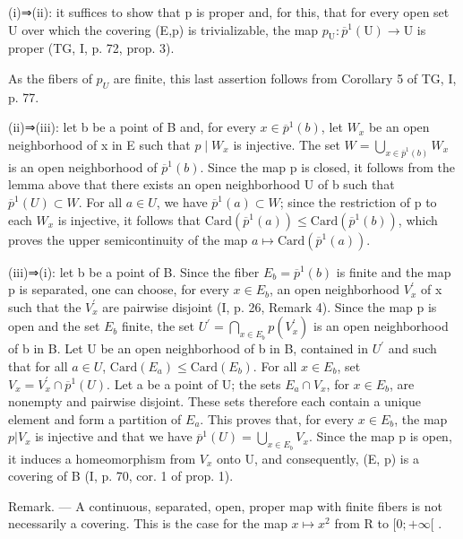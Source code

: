 (i)⇒(ii): it suffices to show that p is proper and, for this, that for every open set U over which the covering (E,p) is trivializable, the map \(p_{\mathrm{U}}\colon \overline{p}^{1}(\mathrm{U})\to\mathrm{U}\) is proper (TG, I, p. 72, prop. 3).

As the fibers of \(p_{U}\) are finite, this last assertion follows from Corollary 5 of TG, I, p. 77.

(ii)⇒(iii): let b be a point of B and, for every \(x \in \overline{p}^{1}(b)\), let \(W_{x}\) be an open neighborhood of x in E such that \(p \mid W_{x}\) is injective. The set \(W = \bigcup_{x \in \overline{p}^{1}(b)} W_{x}\) is an open neighborhood of \(\overline{p}^{1}(b)\). Since the map p is closed, it follows from the lemma above that there exists an open neighborhood U of b such that \(\overline{p}^{1}(U) \subset W\). For all \(a \in U\), we have \(\overline{p}^{1}(a) \subset W\); since the restriction of p to each \(W_{x}\) is injective, it follows that \(\text{Card}(\overline{p}^{1}(a)) \leqslant \text{Card}(\overline{p}^{1}(b))\), which proves the upper semicontinuity of the map \(a \mapsto \text{Card}(\overline{p}^{1}(a))\).

(iii)⇒(i): let b be a point of B. Since the fiber \(E_{b} = \overline{p}^{1}(b)\) is finite and the map p is separated, one can choose, for every \(x \in E_{b}\), an open neighborhood \(V_{x}^{\prime}\) of x such that the \(V_{x}^{\prime}\) are pairwise disjoint (I, p. 26, Remark 4). Since the map p is open and the set \(E_{b}\) finite, the set \(U^{\prime} = \bigcap_{x \in E_{b}} p(V_{x}^{\prime})\) is an open neighborhood of b in B. Let U be an open neighborhood of b in B, contained in \(U^{\prime}\) and such that for all \(a \in U\), \(\text{Card}(E_{a}) \leqslant \text{Card}(E_{b})\). For all \(x \in E_{b}\), set \(V_{x} = V_{x}^{\prime} \cap \overline{p}^{1}(U)\). Let a be a point of U; the sets \(E_{a} \cap V_{x}\), for \(x \in E_{b}\), are nonempty and pairwise disjoint. These sets therefore each contain a unique element and form a partition of \(E_{a}\). This proves that, for every \(x \in E_{b}\), the map \(p | V_{x}\) is injective and that we have \(\overline{p}^{1}(U) = \bigcup_{x \in E_{b}} V_{x}\). Since the map p is open, it induces a homeomorphism from \(V_{x}\) onto U, and consequently, (E, p) is a covering of B (I, p. 70, cor. 1 of prop. 1).

Remark. --- A continuous, separated, open, proper map with finite fibers is not necessarily a covering. This is the case for the map \(x \mapsto x^{2}\) from R to \([0; +\infty[\) .


